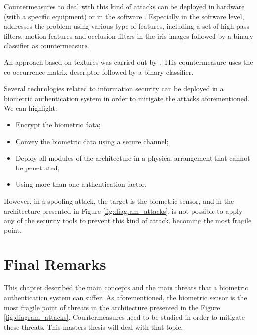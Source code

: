 Countermeasures to deal with this kind of attacks can be deployed in hardware (with a specific equipment) or in the software \cite{Galbally_ICB-2012}. Especially in the software level, \cite{Galbally_ICB-2012} addresses the problem using various type of features, including a set of  high pass filters, motion features and occlusion filters in the iris images followed by a binary classifier as countermeasure. 

An approach based on textures was carried out by \cite{ZhuoshiWei}. This countermeasure uses the co-occurrence matrix descriptor followed by a binary classifier. 



Several technologies related to information security can be deployed in a biometric authentication system in order to mitigate the attacks aforementioned. We can highlight:
\begin{itemize}
        \item Encrypt the biometric data;
        \item Convey the biometric data using a secure channel;
        \item Deploy all modules of the architecture in a physical arrangement that cannot be penetrated;
        \item Using more than one authentication factor.
\end{itemize}
However, in a spoofing attack, the target is the biometric sensor, and in the architecture presented in Figure \ref{fig:diagram_attacks}, is not possible to apply any of the security tools to prevent this kind of attack, becoming the most fragile point. 

\section{Final Remarks}
\label{sec:FinalRemarks}

This chapter described the main concepts and the main threats that a biometric authentication system can suffer. As aforementioned, the biometric sensor is the most fragile point of threats in the architecture presented in the Figure \ref{fig:diagram_attacks}. Countermeasures need to be studied in order to mitigate these threats. This masters thesis will deal with that topic.

